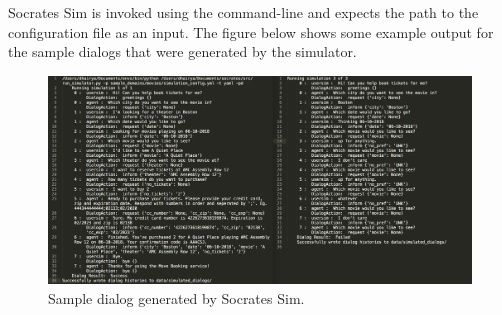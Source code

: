 \clearpage

Socrates Sim is invoked using the command-line and expects the path to the configuration file as an input. The figure below shows some example output for the sample dialogs that were generated by the simulator.

\begin{figure}[h!]
	\centering
	\includegraphics[scale=.15]{diagrams/movie_output.jpeg}
	\caption{ Sample dialog generated by Socrates Sim.}
	\label{fig:movie_output}
\end{figure}




